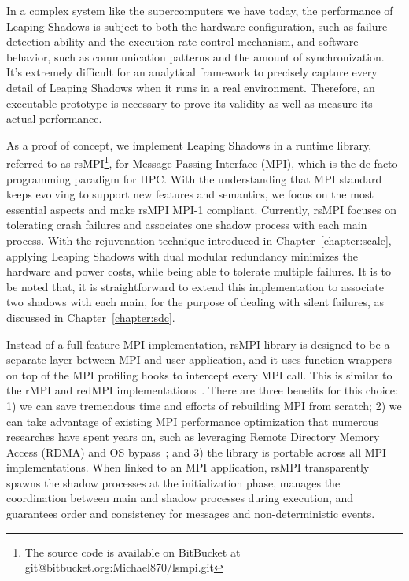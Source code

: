 In a complex system like the supercomputers we have today, the performance of Leaping Shadows is subject to both the hardware configuration, such as failure detection ability and the execution rate control mechanism, and software behavior, such as communication patterns and the amount of synchronization. 
It's extremely difficult for an analytical framework to precisely capture every detail of Leaping Shadows when it runs in a real environment. Therefore, an executable prototype is necessary to prove its validity as well as measure its actual performance. 

As a proof of concept, we implement Leaping Shadows in a runtime library, referred to as rsMPI\footnote{The source code is available on BitBucket at git@bitbucket.org:Michael870/lsmpi.git}, for Message Passing Interface (MPI), which is the de facto programming paradigm for HPC. With the understanding that MPI standard keeps evolving to support new features and semantics, we focus on the most essential aspects and make rsMPI MPI-1 compliant. %
Currently, rsMPI focuses on tolerating crash failures and associates one shadow process with each main process. %
With the rejuvenation technique introduced in Chapter~\ref{chapter:scale}, applying Leaping Shadows with dual modular redundancy minimizes the hardware and power costs, while being able to tolerate multiple failures. It is to be noted that, it is straightforward to extend this implementation to associate two shadows with each main, for the purpose of dealing with silent failures, as discussed in Chapter~\ref{chapter:sdc}. 


Instead of a full-feature MPI implementation, rsMPI library is designed to be a separate layer between MPI and user application, and it uses function wrappers on top of the MPI profiling hooks to intercept every MPI call. This is similar to the rMPI and redMPI implementations~\cite{ferreira_sc_2011,fiala_2012_sdc}. There are three benefits for this choice: 1) we can save tremendous time and efforts of rebuilding MPI from scratch; 2) we can take advantage of existing MPI performance optimization that numerous researches have spent years on, such as leveraging Remote Directory
Memory Access (RDMA) and OS bypass~\cite{woodall2006high}; and 3) the library is portable across all MPI implementations. 
When linked to an MPI application, rsMPI transparently spawns the shadow processes at the initialization phase, manages the coordination between main and shadow processes during execution, and guarantees order and consistency for messages and non-deterministic events.

